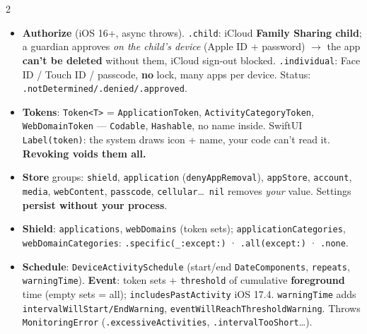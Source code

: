 \documentclass[8pt]{extarticle}
\newcommand\ct[1]{\texttt{#1}}
\newcommand\hd[1]{\par\vspace{3pt}\noindent{\bfseries\color{sheetBlue}#1}\par\vspace{1pt}}
\begin{document}

\begin{multicols}{2}
\raggedright{}

\hd{How it works}
\begin{itemize}
  \item \textbf{Authorize} (iOS 16+, async throws). \ct{.child}: iCloud \textbf{Family Sharing child};
        a guardian approves \emph{on the child's device} (Apple ID + password) $\to$ the app \textbf{can't
        be deleted} without them, iCloud sign-out blocked. \ct{.individual}: Face ID / Touch ID /
        passcode, \textbf{no} lock, many apps per device. Status: \ct{.notDetermined/.denied/.approved}.
  \item \textbf{Tokens}: \ct{Token<T>} = \ct{ApplicationToken}, \ct{ActivityCategoryToken},
        \ct{WebDomainToken} — \ct{Codable}, \ct{Hashable}, no name inside. SwiftUI \ct{Label(token)}:
        the system draws icon + name, your code can't read it. \textbf{Revoking voids them all.}
  \item \textbf{Store} groups: \ct{shield}, \ct{application} (\ct{denyAppRemoval}), \ct{appStore},
        \ct{account}, \ct{media}, \ct{webContent}, \ct{passcode}, \ct{cellular}\ldots\ \ct{nil} removes
        \emph{your} value. Settings \textbf{persist without your process}.
  \item \textbf{Shield}: \ct{applications}, \ct{webDomains} (token sets); \ct{applicationCategories},
        \ct{webDomainCategories}: \ct{.specific(\_:except:)} · \ct{.all(except:)} · \ct{.none}.
  \item \textbf{Schedule}: \ct{DeviceActivitySchedule} (start/end \ct{DateComponents}, \ct{repeats},
        \ct{warningTime}). \textbf{Event}: token sets + \ct{threshold} of cumulative \textbf{foreground}
        time (empty sets = all); \ct{includesPastActivity} iOS 17.4. \ct{warningTime} adds
        \ct{interval\-Will\-Start/\-EndWarning}, \ct{eventWillReachThresholdWarning}. Throws
        \ct{MonitoringError} (\ct{.excessiveActivities}, \ct{.intervalTooShort}\ldots).
\end{itemize}


\end{multicols}
\end{document}
